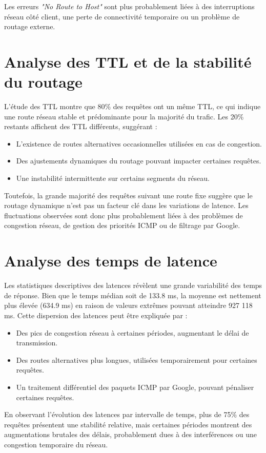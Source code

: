 Les erreurs \textit{"No Route to Host"} sont plus probablement liées à des interruptions réseau côté client, une perte de connectivité temporaire ou un problème de routage externe.

\section{Analyse des TTL et de la stabilité du routage}
L’étude des TTL montre que 80\% des requêtes ont un même TTL, ce qui indique une route réseau stable et prédominante pour la majorité du trafic. Les 20\% restants affichent des TTL différents, suggérant :
\begin{itemize}
	\item L’existence de routes alternatives occasionnelles utilisées en cas de congestion.
	\item Des ajustements dynamiques du routage pouvant impacter certaines requêtes.
	\item Une instabilité intermittente sur certains segments du réseau.
\end{itemize}

Toutefois, la grande majorité des requêtes suivant une route fixe suggère que le routage dynamique n’est pas un facteur clé dans les variations de latence. Les fluctuations observées sont donc plus probablement liées à des problèmes de congestion réseau, de gestion des priorités ICMP ou de filtrage par Google.

\section{Analyse des temps de latence}
Les statistiques descriptives des latences révèlent une grande variabilité des temps de réponse. Bien que le temps médian soit de 133.8 ms, la moyenne est nettement plus élevée (634.9 ms) en raison de valeurs extrêmes pouvant atteindre 927 118 ms. Cette dispersion des latences peut être expliquée par :
\begin{itemize}
	\item Des pics de congestion réseau à certaines périodes, augmentant le délai de transmission.
	\item Des routes alternatives plus longues, utilisées temporairement pour certaines requêtes.
	\item Un traitement différentiel des paquets ICMP par Google, pouvant pénaliser certaines requêtes.
\end{itemize}

En observant l’évolution des latences par intervalle de temps, plus de 75\% des requêtes présentent une stabilité relative, mais certaines périodes montrent des augmentations brutales des délais, probablement dues à des interférences ou une congestion temporaire du réseau.



